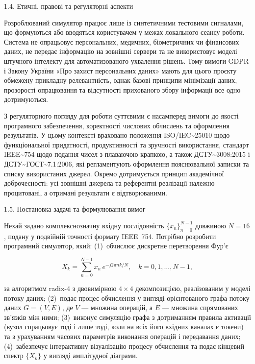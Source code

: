 \protect{}\label{_Toc229682908}{}1.4. Етичні, правові та
регуляторні аспекти

Розроблюваний симулятор працює лише із синтетичними тестовими сигналами,
що формуються або вводяться користувачем у межах локального сеансу
роботи. Система не опрацьовує персональних, медичних, біометричних чи
фінансових даних, не передає інформацію на зовнішні сервери та не
використовує моделі штучного інтелекту для автоматизованого ухвалення
рішень. Тому вимоги GDPR і Закону України «Про захист персональних
даних» мають для цього проєкту обмежену прикладну релевантність, однак
базові принципи мінімізації даних, прозорості опрацювання та відсутності
прихованого збору інформації все одно дотримуються.

З регуляторного погляду для роботи суттєвими є насамперед вимоги до
якості програмного забезпечення, коректності числових обчислень та
оформлення результатів. У цьому контексті враховано положення
ISO/IEC\textasciitilde{}25010 щодо функціональної придатності,
продуктивності та зручності використання, стандарт
IEEE\textasciitilde{}754 щодо подання чисел з плаваючою крапкою, а також
ДСТУ\textasciitilde{}3008:2015 і
ДСТУ\textasciitilde{}ГОСТ\textasciitilde{}7.1:2006, які регламентують
оформлення пояснювальної записки та списку використаних джерел. Окремо
дотримується принцип академічної доброчесності: усі зовнішні джерела та
референтні реалізації належно процитовані, а отримані результати є
відтворюваними.

\protect{}\label{_Toc229682909}{}1.5. Постановка задачі та
формулювання вимог

Нехай задано комплекснозначну вхідну послідовність
\(\{ x_{n}\}_{n = 0}^{N - 1}\) довжиною \(N = 16\), подану у подвійній
точності формату IEEE~754. Потрібно розробити програмний симулятор,
який: (1)~обчислює дискретне перетворення Фур'є

\[X_{k} = \sum_{n = 0}^{N - 1}x_{n}\, e^{- j2\pi nk/N},\quad k = 0,1,\ldots,N - 1,\]

за алгоритмом radix-4 з двовимірною \(4 \times 4\) декомпозицією,
реалізованим у моделі потоку даних; (2)~подає процес обчислення у
вигляді орієнтованого графа потоку даних \(G = (V,E)\), де \(V\) ---
множина операцій, а \(E\) --- множина спрямованих зв'язків між ними;
(3)~виконує симуляцію графа з дотриманням правила активації (вузол
спрацьовує тоді і лише тоді, коли на всіх його вхідних каналах є
токени) та з урахуванням часових параметрів виконання операцій і
передавання даних; (4)~забезпечує інтерактивну візуалізацію процесу
обчислення та подає кінцевий спектр \(\{ X_{k}\}\) у вигляді
амплітудної діаграми.

